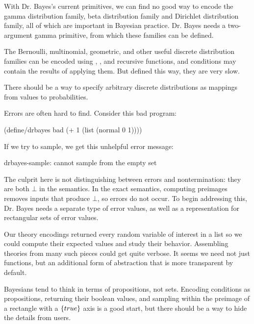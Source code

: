 With Dr. Bayes's current primitives, we can find no good way to encode the gamma distribution family, beta distribution family and Dirichlet distribution family, all of which are important in Bayesian practice.
Dr. Bayes needs a two-argument gamma primitive, from which these families can be defined.

The Bernoulli, multinomial, geometric, and other useful discrete distribution families can be encoded using , \scheme{<}, and recursive functions, and conditions may contain the results of applying them.
But defined this way, they are very slow.

There should be a way to specify arbitrary discrete distributions as mappings from values to probabilities.

Errors are often hard to find.
Consider this bad program:
\begin{center}\singlespacing
\begin{schemedisplay}
(define/drbayes bad
  (+ 1 (list (normal 0 1))))
\end{schemedisplay}
\end{center}
If we try to sample, we get this unhelpful error message:
\begin{center}\singlespacing
\begin{schemedisplay}
drbayes-sample: cannot sample from the empty set
\end{schemedisplay}
\end{center}
The culprit here is not distinguishing between errors and nontermination: they are both $\bot$ in the semantics.
In the exact semantics, computing preimages removes inputs that produce $\bot$, so errors do not occur.
To begin addressing this, Dr. Bayes needs a separate type of error values, as well as a representation for rectangular sets of error values.

Our theory encodings returned every random variable of interest in a list so we could compute their expected values and study their behavior.
Assembling theories from many such pieces could get quite verbose.
It seems we need not just functions, but an additional form of abstraction that is more transparent by default.

Bayesians tend to think in terms of propositions, not sets.
Encoding conditions as propositions, returning their boolean values, and sampling within the preimage of a rectangle with a $\{{true}\}$ axis is a good start, but there should be a way to hide the details from users.

